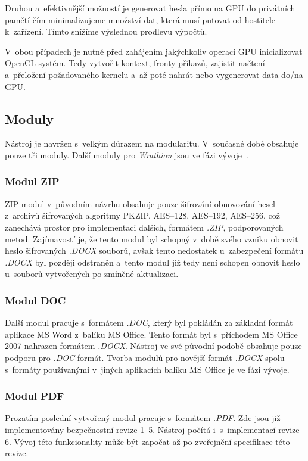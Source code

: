  Druhou a~efektivnější možností je generovat hesla přímo na GPU do privátních pamětí čím
minimalizujeme množství dat, která musí putovat od hostitele k~zařízení. Tímto snížíme výslednou
prodlevu výpočtů.

V~obou případech je nutné před zahájením jakýchkoliv operací GPU inicializovat \linebreak OpenCL
systém. Tedy vytvořit kontext, fronty příkazů, zajistit načtení a~přeložení požadovaného kernelu
a~až poté nahrát nebo vygenerovat data do/na GPU.

\subsection{Moduly}
Nástroj je navržen s~velkým důrazem na modularitu. V~současné době obsahuje pouze tři moduly.
Další moduly pro {\it Wrathion} jsou ve fázi vývoje~\cite{Hranicky}.

\subsubsection{Modul ZIP}
ZIP modul v~původním návrhu obsahuje pouze šifrování obnovování hesel z~archivů šifrovaných
algoritmy PKZIP, AES--128, AES--192, AES--256, což zanechává prostor pro implementaci dalších,
formátem {\it .ZIP}, podporovaných metod. Zajímavostí je, že tento modul byl schopný v~době svého
vzniku obnovit heslo šifrovaných {\it .DOCX} souborů, avšak tento nedostatek u~zabezpečení
formátu {\it .DOCX} byl později odstraněn a~tento modul již tedy není schopen obnovit heslo
u~souborů vytvořených po zmíněné aktualizaci.

\subsubsection{Modul DOC}
Další modul pracuje s~formátem {\it .DOC}, který byl pokládán za základní formát aplikace MS Word
z~balíku MS Office. Tento formát byl s~příchodem MS Office 2007 nahrazen formátem {\it .DOCX}.
Nástroj ve své původní podobě obsahuje pouze podporu pro {\it .DOC} formát. Tvorba modulů pro
novější formát {\it .DOCX} spolu s~formáty používanými v~jiných aplikacích balíku MS Office je ve
fázi vývoje.

\subsubsection{Modul PDF}
Prozatím poslední vytvořený modul pracuje s~formátem {\it .PDF}. Zde jsou již implementovány
bezpečnostní revize 1--5. Nástroj počítá i~s~implementací revize 6. Vývoj této funkcionality může
být započat až po zveřejnění specifikace této revize.


